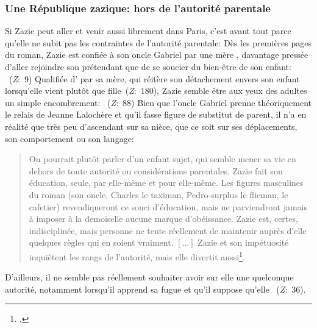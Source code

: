 \subsubsection{Une République zazique: hors de l'autorité parentale}
Si Zazie peut aller et venir aussi librement dans Paris, c'est avant tout parce qu'elle ne subit pas les contraintes de l'autorité parentale: 
Dès les premières pages du roman, Zazie est confiée à son oncle Gabriel par une mère , davantage pressée d'aller rejoindre son prétendant que de se soucier du bien-être de son enfant: ~(\textit{Z}:~9)
Qualifiée d' par sa mère, qui réitère son détachement envers son enfant lorsqu'elle vient  plutôt que  fille~(\textit{Z}:~180), Zazie semble être aux yeux des adultes un simple encombrement: ~(\textit{Z}:~88)
Bien que l'oncle Gabriel prenne théoriquement le relais de Jeanne Lalochère et qu'il fasse figure de substitut de parent, il n'a en réalité que très peu d'ascendant sur sa nièce, que ce soit sur ses déplacements, son comportement ou son langage:
\begin{quote}
  \begin{singlespace}
    \small
    On pourrait plutôt parler d'un enfant sujet, qui semble mener sa vie en dehors de toute autorité ou considérations parentales. Zazie fait son éducation, seule, par elle-même et pour elle-même. Les figures masculines du roman (son oncle, Charles le taximan, Pedro-surplus le flicman, le cafetier) revendiqueront ce souci d'éducation, mais ne parviendront jamais à imposer à la demoiselle aucune marque d'obéissance. Zazie est, certes, indisciplinée, mais personne ne tente réellement de maintenir auprès d'elle quelques règles qui en soient vraiment. $\left[ \dots \right]$ Zazie et son impétuosité inquiètent les rangs de l'autorité, mais elle divertit aussi\footcite[89]{Maurin2007}.
    \normalsize
  \end{singlespace}
\end{quote}
D'ailleurs, il ne semble pas réellement souhaiter avoir sur elle une quelconque autorité, notamment lorsqu'il apprend sa fugue et qu'il suppose qu'elle ~(\textit{Z}:~36).
